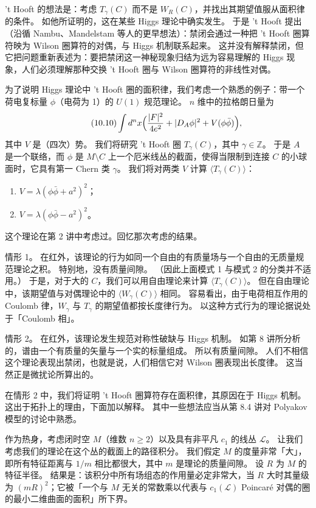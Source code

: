 't Hooft 的想法是：考虑 $T_\gamma(C)$ 而不是 $W_R(C)$，并找出其期望值服从面积律的条件。
如他所证明的，这在某些 Higgs 理论中确实发生。
于是 't Hooft 提出（沿循 Nambu、Mandelstam 等人的更早想法）：禁闭会通过一种把 't Hooft 圈算符映为 Wilson 圈算符的对偶，与 Higgs 机制联系起来。
这并没有解释禁闭，但它把问题重新表述为：要把禁闭这一神秘现象归结为远为容易理解的 Higgs 现象，人们必须理解那种交换 't Hooft 圈与 Wilson 圈算符的非线性对偶。

为了说明 Higgs 理论中 't Hooft 圈的面积律，我们考虑一个熟悉的例子：带一个荷电复标量 $\phi$（电荷为 1）的 $U(1)$ 规范理论。
$n$ 维中的拉格朗日量为
\begin{equation}\tag{10.10}\label{eq:10-10}
\int d^nx\Bigl(\frac{|F|^2}{4e^2}+|D_A\phi|^2+V(\phi\bar\phi)\Bigr),
\end{equation}
其中 $V$ 是（四次）势。
我们将研究 't Hooft 圈 $T_\gamma(C)$，其中 $\gamma\in\mathbb{Z}$。
于是 $A$ 是一个联络，而 $\phi$ 是 $M\setminus C$ 上一个厄米线丛的截面，使得当限制到连接 $C$ 的小球面时，它具有第一 Chern 类 $\gamma$。
我们将对两类 $V$ 计算 $\langle T_\gamma(C)\rangle$：
\begin{enumerate}
\item $V=\lambda(\phi\bar\phi+a^2)^2$；
\item $V=\lambda(\phi\bar\phi-a^2)^2$。
\end{enumerate}

这个理论在第 2 讲中考虑过。回忆那次考虑的结果。

情形 1。
在红外，该理论的行为如同一个自由的有质量场与一个自由的无质量规范理论之积。
特别地，没有质量间隙。
（因此上面模式 1 与模式 2 的分类并不适用。）
于是，对于大的 $C$，我们可以用自由理论来计算 $\langle T_\gamma(C)\rangle$。
但在自由理论中，该期望值与对偶理论中的 $\langle W_\gamma(C)\rangle$ 相同。
容易看出，由于电荷相互作用的 Coulomb 律，$W_\gamma$ 与 $T_\gamma$ 的期望值都按长度律行为。
以这种方式行为的理论据说处于「Coulomb 相」。

情形 2。
在红外，该理论发生规范对称性破缺与 Higgs 机制。
如第 8 讲所分析的，谱由一个有质量的矢量与一个实的标量组成。
所以有质量间隙。
人们不相信这个理论表现出禁闭，也就是说，人们相信它对 Wilson 圈表现出长度律。
这当然正是微扰论所算出的。

在情形 2 中，我们将证明 't Hooft 圈算符存在面积律，其原因在于 Higgs 机制。
这出于拓扑上的理由，下面加以解释。
其中一些想法应当从第 8.4 讲对 Polyakov 模型的讨论中熟悉。

作为热身，考虑闭时空 $M$（维数 $n\ge2$）以及具有非平凡 $c_1$ 的线丛 $\mathcal{L}$。
让我们考虑我们的理论在这个丛的截面上的路径积分。
我们假定 $M$ 的度量非常「大」，即所有特征距离与 $1/m$ 相比都很大，其中 $m$ 是理论的质量间隙。
设 $R$ 为 $M$ 的特征半径。
结果是：该积分中所有场组态的作用量必定非常大，当 $R$ 大时其量级为 $(mR)^2$；它被「一个与 $M$ 无关的常数乘以代表与 $c_1(\mathcal{L})$ Poincaré 对偶的圈的最小二维曲面的面积」所下界。

